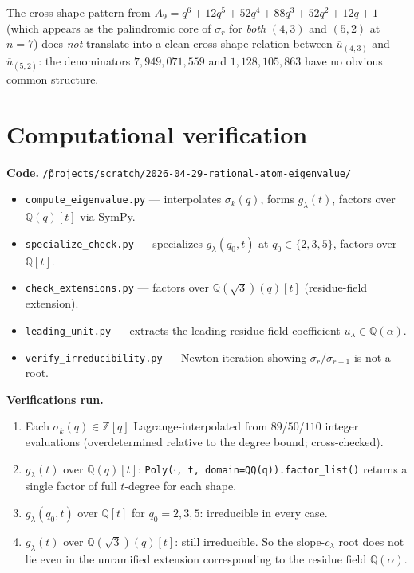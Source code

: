 \documentclass[11pt]{article}
\theoremstyle{remark}
\begin{document}
The cross-shape pattern from $A_9 = q^6 + 12q^5 + 52q^4 + 88q^3 + 52q^2 +
12q + 1$ (which appears as the palindromic core of $\sigma_r$ for
\emph{both} $(4,3)$ and $(5,2)$ at $n=7$) does \emph{not} translate
into a clean cross-shape relation between $\overline{u}_{(4,3)}$ and
$\overline{u}_{(5,2)}$: the denominators $7{,}949{,}071{,}559$ and
$1{,}128{,}105{,}863$ have no obvious common structure.

\section{Computational verification}

\textbf{Code.} \texttt{\~/projects/scratch/2026-04-29-rational-atom-eigenvalue/}
\begin{itemize}
\item \texttt{compute\_eigenvalue.py} — interpolates $\sigma_k(q)$,
  forms $g_\lambda(t)$, factors over $\mathbb{Q}(q)[t]$ via SymPy.
\item \texttt{specialize\_check.py} — specializes
  $g_\lambda(q_0, t)$ at $q_0 \in \{2, 3, 5\}$, factors over $\mathbb{Q}[t]$.
\item \texttt{check\_extensions.py} — factors over
  $\mathbb{Q}(\sqrt{3})(q)[t]$ (residue-field extension).
\item \texttt{leading\_unit.py} — extracts the leading residue-field
  coefficient $\overline{u}_\lambda \in \mathbb{Q}(\alpha)$.
\item \texttt{verify\_irreducibility.py} — Newton iteration showing
  $\sigma_r/\sigma_{r-1}$ is not a root.
\end{itemize}

\textbf{Verifications run.}
\begin{enumerate}
\item Each $\sigma_k(q) \in \mathbb{Z}[q]$ Lagrange-interpolated from
  $89$/$50$/$110$ integer evaluations (overdetermined relative to
  the degree bound; cross-checked).
\item $g_\lambda(t)$ over $\mathbb{Q}(q)[t]$:
  \texttt{Poly($\cdot$, t, domain=QQ(q)).factor\_list()} returns a
  single factor of full $t$-degree for each shape.
\item $g_\lambda(q_0, t)$ over $\mathbb{Q}[t]$ for
  $q_0 = 2, 3, 5$: irreducible in every case.
\item $g_\lambda(t)$ over $\mathbb{Q}(\sqrt{3})(q)[t]$: still
  irreducible. So the slope-$c_\lambda$ root does not lie even in the
  unramified extension corresponding to the residue field
  $\mathbb{Q}(\alpha)$.
\end{enumerate}
\end{document}
